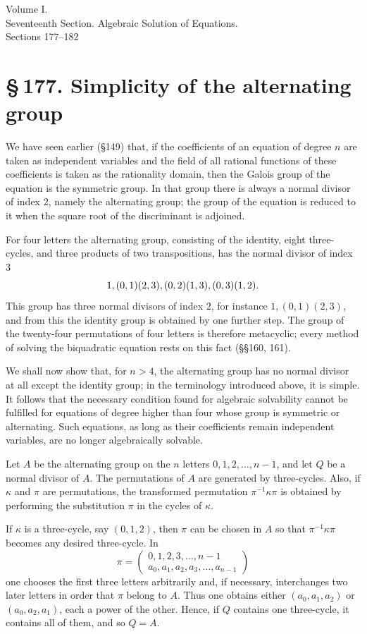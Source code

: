 \documentclass[11pt]{article}
\newcommand{\sect}[2]{\section*{\S\,#1. #2}}
\newcommand{\perm}[2]{\begin{pmatrix}#1\\#2\end{pmatrix}}
\begin{document}
\begin{center}
{\large Volume I.}\\[0.35em]
{\Large Seventeenth Section. Algebraic Solution of Equations.}\\[0.35em]
{\large Sections 177--182}
\end{center}

\sect{177}{Simplicity of the alternating group}

We have seen earlier (§149) that, if the coefficients of an equation of degree $n$ are taken as independent variables and the field of all rational functions of these coefficients is taken as the rationality domain, then the Galois group of the equation is the symmetric group. In that group there is always a normal divisor of index $2$, namely the alternating group; the group of the equation is reduced to it when the square root of the discriminant is adjoined.

For four letters the alternating group, consisting of the identity, eight three-cycles, and three products of two transpositions, has the normal divisor of index $3$
\[
  1,\\ (0,1)(2,3),\\ (0,2)(1,3),\\ (0,3)(1,2).
\]
This group has three normal divisors of index $2$, for instance $1,(0,1)(2,3)$, and from this the identity group is obtained by one further step. The group of the twenty-four permutations of four letters is therefore metacyclic; every method of solving the biquadratic equation rests on this fact (§§160, 161).

We shall now show that, for $n>4$, the alternating group has no normal divisor at all except the identity group; in the terminology introduced above, it is simple. It follows that the necessary condition found for algebraic solvability cannot be fulfilled for equations of degree higher than four whose group is symmetric or alternating. Such equations, as long as their coefficients remain independent variables, are no longer algebraically solvable.

Let $A$ be the alternating group on the $n$ letters $0,1,2,\ldots,n-1$, and let $Q$ be a normal divisor of $A$. The permutations of $A$ are generated by three-cycles. Also, if $\kappa$ and $\pi$ are permutations, the transformed permutation $\pi^{-1}\kappa\pi$ is obtained by performing the substitution $\pi$ in the cycles of $\kappa$.

If $\kappa$ is a three-cycle, say $(0,1,2)$, then $\pi$ can be chosen in $A$ so that $\pi^{-1}\kappa\pi$ becomes any desired three-cycle. In
\[
  \pi=\perm{0,1,2,3,\ldots,n-1}{a_0,a_1,a_2,a_3,\ldots,a_{n-1}}
\]
one chooses the first three letters arbitrarily and, if necessary, interchanges two later letters in order that $\pi$ belong to $A$. Thus one obtains either $(a_0,a_1,a_2)$ or $(a_0,a_2,a_1)$, each a power of the other. Hence, if $Q$ contains one three-cycle, it contains all of them, and so $Q=A$.
\end{document}
